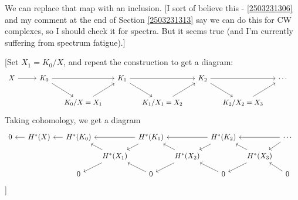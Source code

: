\documentclass{MetricNotes2023}
\begin{document}
We can replace that map with an inclusion. [I sort of believe this - \ref{2503231306} and my comment at the end of Section \ref{2503231313} say we can do this for CW complexes, so I should check it for spectra. But it seems true (and I'm currently suffering from spectrum fatigue).]

[Set \(X_1=K_0/X\), and repeat the construction to get a diagram:
\begin{equation}\label{2503301114}
\begin{tikzcd}[column sep=3ex] 
 X \arrow[rr, ""]  & & K_0 \arrow[rr, ""] \arrow[dr, ""] & & K_1 \arrow[dr, ""] \arrow[rr, ""] & & K_2 \arrow[dr, ""] \arrow[rr, ""] & & \cdots \\ 
  &&& K_0/X=X_1 \arrow[ur, ""] & & K_1/X_1=X_2 \arrow[ur, ""] & & K_2/X_2=X_3 \arrow[ur, ""] &  &
 \end{tikzcd}\nonumber
\end{equation}
Taking cohomology, we get a diagram
\[\begin{tikzcd}[column sep=1.5ex, row sep = 2ex, arrows=<-]
 0 \arrow[rr, ""] && H^*(X) \arrow[rr,""] & & H^*(K_0) \arrow[rr, ""] \arrow[dr, ""] & & H^*(K_1) \arrow[dr, ""] \arrow[rr, ""] & & H^*(K_2) \arrow[dr, ""] \arrow[rr, ""] & & \cdots \\ 
  &&&&& H^*(X_1) \arrow[ur, ""] \arrow[dr] & & H^*(X_2) \arrow[ur, ""] \arrow[dr] & & H^*(X_3) \arrow[ur, ""] \arrow[dr] &  &\\
&&&& 0 \arrow[ur] && 0 \arrow[ur] && 0 \arrow[ur] && 0
 \end{tikzcd}\] 
]
\end{document}
